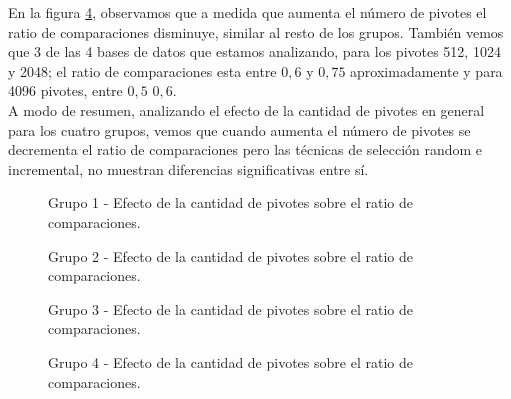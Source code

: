 En la figura \ref{fig:EP-g4}, observamos que a medida que aumenta el n\'umero de pivotes el ratio de comparaciones disminuye, similar al resto de los grupos. Tambi\'en vemos que 3 de las 4 bases de datos que estamos analizando, para los pivotes 512, 1024 y 2048; el ratio de comparaciones esta entre $0,6$ y $0,75$ aproximadamente y para 4096 pivotes, entre $0,5$ $0,6$.\\

A modo de resumen, analizando el efecto de la cantidad de pivotes en general para los cuatro grupos, vemos que cuando aumenta el n\'umero de pivotes se decrementa el ratio de comparaciones pero las t\'ecnicas de selecci\'on random e incremental, no muestran diferencias significativas entre s\'i.

\begin{figure}[tb]
\centering
{}
		\caption{\small Grupo 1 - Efecto de la cantidad de pivotes sobre el ratio de comparaciones.}
		\label{fig:EP-g1}
\end{figure}

\begin{figure}[H]
\centering
{}
		\caption{\small Grupo 2 - Efecto de la cantidad de pivotes sobre el ratio de comparaciones.}
		\label{fig:EP-g2}
\end{figure}

\begin{figure}[tb]
\centering
{}
		\caption{\small Grupo 3 - Efecto de la cantidad de pivotes sobre el ratio de comparaciones.}
		\label{fig:EP-g3}
\end{figure}

\begin{figure}[tb]
\centering	
{}
		\caption{\small Grupo 4 - Efecto de la cantidad de pivotes sobre el ratio de comparaciones.}
		\label{fig:EP-g4}
\end{figure}

